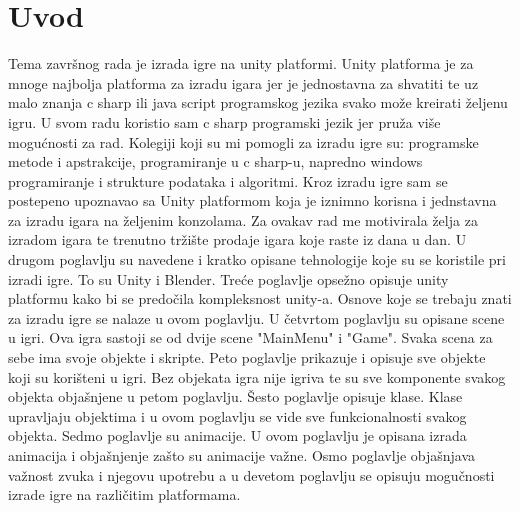 \section{Uvod}
Tema završnog rada je izrada igre na unity platformi. Unity platforma je za mnoge najbolja platforma za izradu igara jer je jednostavna za shvatiti te uz malo znanja c sharp ili java script programskog jezika svako može kreirati željenu igru. U svom radu koristio sam c sharp programski jezik jer pruža više mogućnosti za rad. Kolegiji koji su mi pomogli za izradu igre su: programske metode i apstrakcije, programiranje u c sharp-u, napredno windows programiranje i strukture podataka i algoritmi.
Kroz izradu igre sam se postepeno upoznavao sa Unity platformom koja je iznimno korisna i jednstavna za izradu igara na željenim konzolama.
Za ovakav rad me motivirala želja za izradom igara te trenutno tržište prodaje igara koje raste iz dana u dan.
U drugom poglavlju su navedene i kratko opisane tehnologije koje su se koristile pri izradi igre. To su Unity i Blender.
Treće poglavlje opsežno opisuje unity platformu kako bi se predočila kompleksnost unity-a. Osnove koje se trebaju znati za izradu igre se nalaze u ovom poglavlju.
U četvrtom poglavlju su opisane scene u igri. Ova igra sastoji se od dvije scene "MainMenu" i "Game". Svaka scena za sebe ima svoje objekte i skripte.
Peto poglavlje prikazuje i opisuje sve objekte koji su korišteni u igri. Bez objekata igra nije igriva te su sve komponente svakog objekta objašnjene u petom poglavlju.
Šesto poglavlje opisuje klase. Klase upravljaju objektima i u ovom poglavlju se vide sve funkcionalnosti svakog objekta.
Sedmo poglavlje su animacije. U ovom poglavlju je opisana izrada animacija i objašnjenje zašto su animacije važne.
Osmo poglavlje objašnjava važnost zvuka i njegovu upotrebu a u devetom poglavlju se opisuju mogučnosti izrade igre na različitim platformama.
